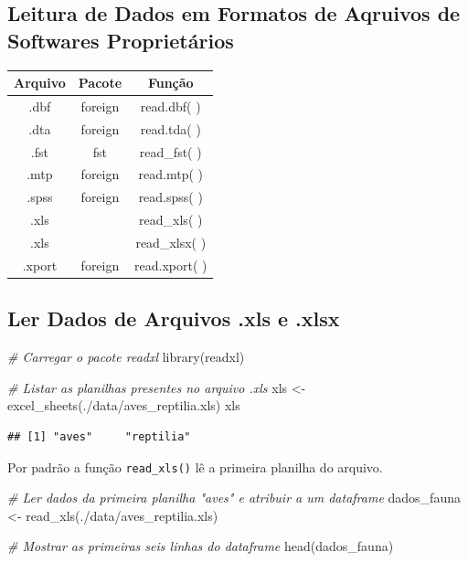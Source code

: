 \documentclass[
]{article}
\newenvironment{Shaded}{\begin{snugshade}}{\end{snugshade}}
\newcommand{\CommentTok}[1]{\textcolor[rgb]{0.56,0.35,0.01}{\textit{#1}}}
\newcommand{\FunctionTok}[1]{\textcolor[rgb]{0.00,0.00,0.00}{#1}}
\newcommand{\NormalTok}[1]{#1}
\newcommand{\OtherTok}[1]{\textcolor[rgb]{0.56,0.35,0.01}{#1}}
\newcommand{\StringTok}[1]{\textcolor[rgb]{0.31,0.60,0.02}{#1}}
\begin{document}
\hypertarget{leitura-de-dados-em-formatos-de-aqruivos-de-softwares-proprietuxe1rios}{%
\subsection{Leitura de Dados em Formatos de Aqruivos de Softwares
Proprietários}\label{leitura-de-dados-em-formatos-de-aqruivos-de-softwares-proprietuxe1rios}}

\begin{longtable}[]{@{}ccc@{}}
\toprule()
Arquivo & Pacote & Função \\
\midrule()
\endhead
.dbf & foreign & read.dbf( ) \\
.dta & foreign & read.tda( ) \\
.fst & fst & read\_fst( ) \\
.mtp & foreign & read.mtp( ) \\
.spss & foreign & read.spss( ) \\
.xls & & read\_xls( ) \\
.xls & & read\_xlsx( ) \\
.xport & foreign & read.xport( ) \\
\bottomrule()
\end{longtable}

\hypertarget{ler-dados-de-arquivos-.xls-e-.xlsx}{%
\subsection{Ler Dados de Arquivos .xls e
.xlsx}\label{ler-dados-de-arquivos-.xls-e-.xlsx}}

\begin{Shaded}
\begin{Highlighting}[]
\CommentTok{\# Carregar o pacote readxl}
\FunctionTok{library}\NormalTok{(readxl)}

\CommentTok{\# Listar as planilhas presentes no arquivo .xls}
\NormalTok{xls }\OtherTok{\textless{}{-}} \FunctionTok{excel\_sheets}\NormalTok{(}\StringTok{\textquotesingle{}./data/aves\_reptilia.xls\textquotesingle{}}\NormalTok{)}
\NormalTok{xls}
\end{Highlighting}
\end{Shaded}

\begin{verbatim}
## [1] "aves"     "reptilia"
\end{verbatim}

Por padrão a função \texttt{read\_xls()} lê a primeira planilha do
arquivo.

\begin{Shaded}
\begin{Highlighting}[]
\CommentTok{\# Ler dados da primeira planilha "aves" e atribuir a um dataframe}
\NormalTok{dados\_fauna }\OtherTok{\textless{}{-}} \FunctionTok{read\_xls}\NormalTok{(}\StringTok{\textquotesingle{}./data/aves\_reptilia.xls\textquotesingle{}}\NormalTok{)}

\CommentTok{\# Mostrar as primeiras seis linhas do dataframe}
\FunctionTok{head}\NormalTok{(dados\_fauna)}
\end{Highlighting}
\end{Shaded}
\end{document}
